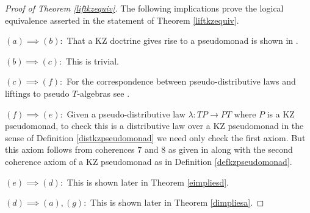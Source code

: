 \documentclass[a4paper,oneside,english]{amsart}
\numberwithin{equation}{section}
\numberwithin{figure}{section}
\theoremstyle{plain}
\theoremstyle{definition}
\theoremstyle{remark}
\theoremstyle{definition}
\theoremstyle{plain}
\theoremstyle{plain}
\theoremstyle{plain}
\begin{document}
\begin{proof}
[Proof of Theorem \ref{liftkzequiv}] The following implications prove
the logical equivalence asserted in the statement of Theorem \ref{liftkzequiv}.

$\left(a\right)\implies\left(b\right)\colon$ That a KZ doctrine gives
rise to a pseudomonad is shown in \cite[Theorem 4.1]{marm2012}.

$\left(b\right)\implies\left(c\right)\colon$ This is trivial.

$\left(c\right)\implies\left(f\right)\colon$ For the correspondence
between pseudo-distributive laws and liftings to pseudo $T$-algebras
see \cite[Theorem 5.4]{cheng2003}.

$\left(f\right)\implies\left(e\right)\colon$ Given a pseudo-distributive
law $\lambda\colon TP\to PT$ where $P$ is a KZ pseudomonad, to check
this is a distributive law over a KZ pseudomonad in the sense of Definition
\ref{distkzpseudomonad} we need only check the first axiom. But this
axiom follows from coherences $7$ and $8$ as given in \cite[Section 4]{marm1999}
along with the second coherence axiom of a KZ pseudomonad as in Definition
\ref{defkzpseudomonad}.

$\left(e\right)\implies\left(d\right)\colon$ This is shown later
in Theorem \ref{eimpliesd}.

$\left(d\right)\implies\left(a\right),\left(g\right)\colon$ This
is shown later in Theorem \ref{dimpliesa}. 


\end{proof}
\end{document}
